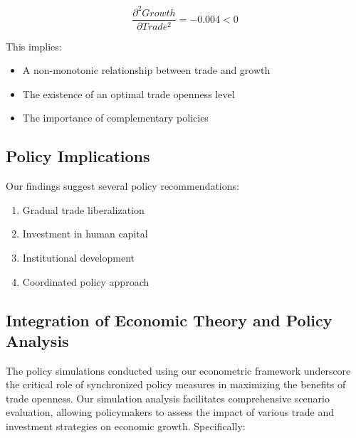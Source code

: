 \documentclass[12pt,a4paper]{article}
\theoremstyle{definition}
\begin{document}
\begin{equation}
\frac{\partial^2 Growth}{\partial Trade^2} = -0.004 < 0
\end{equation}

This implies:
\begin{itemize}
    \item A non-monotonic relationship between trade and growth
    \item The existence of an optimal trade openness level
    \item The importance of complementary policies
\end{itemize}

\subsection{Policy Implications}
Our findings suggest several policy recommendations:
\begin{enumerate}
    \item Gradual trade liberalization
    \item Investment in human capital
    \item Institutional development
    \item Coordinated policy approach
\end{enumerate}

\subsection{Integration of Economic Theory and Policy Analysis}
The policy simulations conducted using our econometric framework underscore the critical role of synchronized policy measures in maximizing the benefits of trade openness. Our simulation analysis facilitates comprehensive scenario evaluation, allowing policymakers to assess the impact of various trade and investment strategies on economic growth. Specifically:
\end{document}
